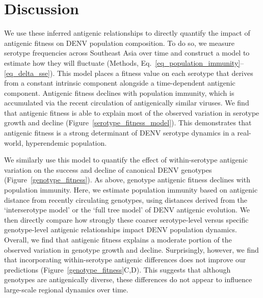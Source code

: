 
\section{Discussion}
We use these inferred antigenic relationships to directly quantify the impact of antigenic fitness on DENV population composition.
To do so, we measure serotype frequencies across Southeast Asia over time and construct a model to estimate how they will fluctuate (Methods, Eq.~\ref{eq_population_immunity}--\ref{eq_delta_sse}).
This model places a fitness value on each serotype that derives from a constant intrinsic component alongside a time-dependent antigenic component.
Antigenic fitness declines with population immunity, which is accumulated via the recent circulation of antigenically similar viruses.
We find that antigenic fitness is able to explain most of the observed variation in serotype growth and decline (Figure~\ref{serotype_fitness_model}).
This demonstrates that antigenic fitness is a strong determinant of DENV serotype dynamics in a real-world, hyperendemic population.

We similarly use this model to quantify the effect of within-serotype antigenic variation on the success and decline of canonical DENV genotypes (Figure~\ref{genotype_fitness}).
As above, genotype antigenic fitness declines with population immunity.
Here, we estimate population immunity based on antigenic distance from recently circulating genotypes, using distances derived from the `interserotype model' or the `full tree model' of DENV antigenic evolution.
We then directly compare how strongly these coarser serotype-level versus specific genotype-level antigenic relationships impact DENV population dynamics.
Overall, we find that antigenic fitness explains a moderate portion of the observed variation in genotype growth and decline.
Surprisingly, however, we find that incorporating within-serotype antigenic differences does not improve our predictions (Figure~\ref{genotype_fitness}C,D).
This suggests that although genotypes are antigenically diverse, these differences do not appear to influence large-scale regional dynamics over time.

